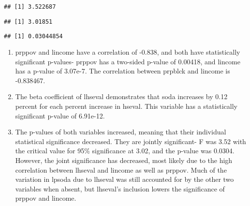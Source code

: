 \documentclass[
]{article}
\newenvironment{Shaded}{\begin{snugshade}}{\end{snugshade}}
\newcommand{\DataTypeTok}[1]{\textcolor[rgb]{0.13,0.29,0.53}{#1}}
\newcommand{\DecValTok}[1]{\textcolor[rgb]{0.00,0.00,0.81}{#1}}
\newcommand{\FloatTok}[1]{\textcolor[rgb]{0.00,0.00,0.81}{#1}}
\newcommand{\KeywordTok}[1]{\textcolor[rgb]{0.13,0.29,0.53}{\textbf{#1}}}
\newcommand{\NormalTok}[1]{#1}
\newcommand{\OperatorTok}[1]{\textcolor[rgb]{0.81,0.36,0.00}{\textbf{#1}}}
\begin{document}
\begin{verbatim}
## [1] 3.522687
\end{verbatim}

\begin{Shaded}
\end{Shaded}

\begin{verbatim}
## [1] 3.01851
\end{verbatim}

\begin{Shaded}
\end{Shaded}

\begin{verbatim}
## [1] 0.03044854
\end{verbatim}

\begin{enumerate}
\def\labelenumi{\roman{enumi})}
\setcounter{enumi}{1}
\item
  prppov and lincome have a correlation of -0.838, and both have
  statistically significant p-values- prppov has a two-sided p-value of
  0.00418, and lincome has a p-value of 3.07e-7. The correlation between
  prpblck and lincome is -0.838467.
\item
  The beta coefficient of lhseval demonstrates that soda increases by
  0.12 percent for each percent increase in hseval. This variable has a
  statistically significant p-value of 6.91e-12.
\item
  The p-values of both variables increased, meaning that their
  individual statistical significance decreased. They are jointly
  significant- F was 3.52 with the critical value for 95\% significance
  at 3.02, and the p-value was 0.0304. However, the joint significance
  has decreased, most likely due to the high correlation between lhseval
  and lincome as well as prppov. Much of the variation in lpsoda due to
  lhseval was still accounted for by the other two variables when
  absent, but lhseval's inclusion lowers the significance of prppov and
  lincome.
\end{enumerate}
\end{document}
